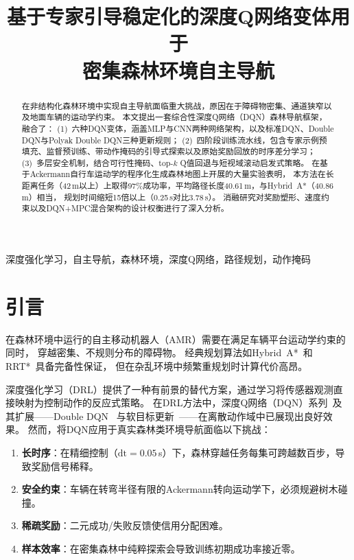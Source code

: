 \documentclass[conference]{IEEEtran}
\begin{document}
\title{基于专家引导稳定化的深度Q网络变体用于\\密集森林环境自主导航}

\author{
}

\maketitle

\begin{abstract}
在非结构化森林环境中实现自主导航面临重大挑战，原因在于障碍物密集、通道狭窄以及地面车辆的运动学约束。
本文提出一套综合性深度Q网络（DQN）森林导航框架，融合了：
(1)~六种DQN变体，涵盖MLP与CNN两种网络架构，以及标准DQN、Double DQN与Polyak Double DQN三种更新规则；
(2)~四阶段训练流水线，包含专家示例预填充、监督预训练、带动作掩码的引导式探索以及原始奖励回放的时序差分学习；
(3)~多层安全机制，结合可行性掩码、top-$k$ Q值回退与短视域滚动启发式策略。
在基于Ackermann自行车运动学的程序化生成森林地图上开展的大量实验表明，
本方法在长距离任务（42\,m以上）上取得$97\%$成功率，平均路径长度40.61\,m，与Hybrid~A*（40.86\,m）相当，
规划时间缩短15倍以上（0.25\,s对比3.78\,s）。
消融研究对奖励塑形、速度约束以及DQN+MPC混合架构的设计权衡进行了深入分析。
\end{abstract}

\begin{IEEEkeywords}
深度强化学习，自主导航，森林环境，深度Q网络，路径规划，动作掩码
\end{IEEEkeywords}

\section{引言}\label{sec:intro}

在森林环境中运行的自主移动机器人（AMR）需要在满足车辆平台运动学约束的同时，
穿越密集、不规则分布的障碍物。
经典规划算法如Hybrid~A*~\cite{dolgov2010path}和RRT*~\cite{karaman2011sampling}具备完备性保证，
但在杂乱环境中频繁重规划时计算代价高昂。

深度强化学习（DRL）提供了一种有前景的替代方案，通过学习将传感器观测直接映射为控制动作的反应式策略。
在DRL方法中，深度Q网络（DQN）系列~\cite{mnih2015human}及其扩展——Double DQN~\cite{van2016deep}
与软目标更新~\cite{lillicrap2015continuous}——在离散动作域中已展现出良好效果。
然而，将DQN应用于真实森林类环境导航面临以下挑战：
\begin{enumerate}
    \item \textbf{长时序}：在精细控制（$\text{dt} = 0.05$\,s）下，森林穿越任务每集可跨越数百步，导致奖励信号稀释。
    \item \textbf{安全约束}：车辆在转弯半径有限的Ackermann转向运动学下，必须规避树木碰撞。
    \item \textbf{稀疏奖励}：二元成功/失败反馈使信用分配困难。
    \item \textbf{样本效率}：在密集森林中纯粹探索会导致训练初期成功率接近零。
\end{enumerate}
\end{document}
